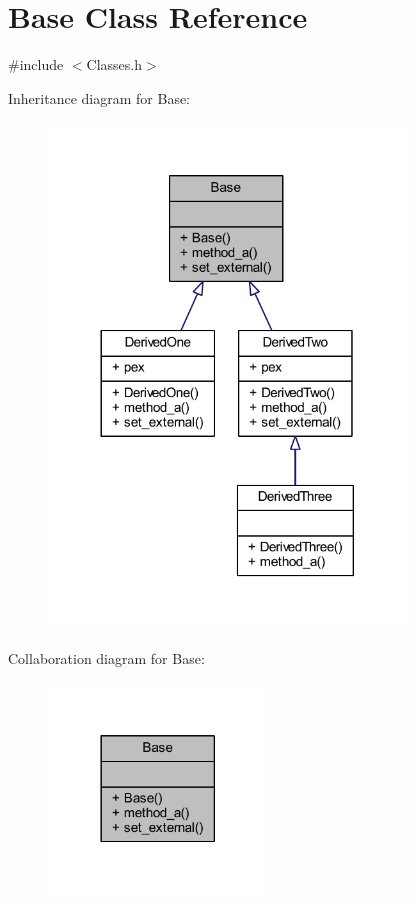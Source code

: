 \hypertarget{class_base}{}\section{Base Class Reference}
\label{class_base}


{\ttfamily \#include $<$Classes.\+h$>$}



Inheritance diagram for Base\+:
\nopagebreak
\begin{figure}[H]
\begin{center}
\leavevmode
\includegraphics[width=269pt]{class_base__inherit__graph}
\end{center}
\end{figure}


Collaboration diagram for Base\+:
\nopagebreak
\begin{figure}[H]
\begin{center}
\leavevmode
\includegraphics[width=165pt]{class_base__coll__graph}
\end{center}
\end{figure}
